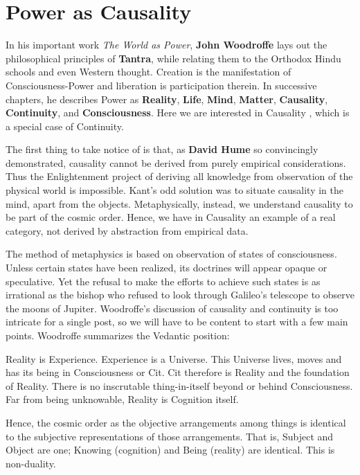 \section{Power as Causality}

In his important work \textit{The World as Power}, \textbf{John Woodroffe} lays out the philosophical principles of \textbf{Tantra}, while relating them to the Orthodox Hindu schools and even Western thought. Creation is the manifestation of Consciousness-Power and liberation is participation therein. In successive chapters, he describes Power as \textbf{Reality}, \textbf{Life}, \textbf{Mind}, \textbf{Matter}, \textbf{Causality}, \textbf{Continuity}, and \textbf{Consciousness}. Here we are interested in Causality , which is a special case of Continuity.

The first thing to take notice of is that, as \textbf{David Hume} so convincingly demonstrated, causality cannot be derived from purely empirical considerations. Thus the Enlightenment project of deriving all knowledge from observation of the physical world is impossible. Kant's odd solution was to situate causality in the mind, apart from the objects. Metaphysically, instead, we understand causality to be part of the cosmic order. Hence, we have in Causality an example of a real category, not derived by abstraction from empirical data.

The method of metaphysics is based on observation of states of consciousness. Unless certain states have been realized, its doctrines will appear opaque or speculative. Yet the refusal to make the efforts to achieve such states is as irrational as the bishop who refused to look through Galileo's telescope to observe the moons of Jupiter. Woodroffe's discussion of causality and continuity is too intricate for a single post, so we will have to be content to start with a few main points. Woodroffe summarizes the Vedantic position:

\begin{quotex}
Reality is Experience. Experience is a Universe. This Universe lives, moves and has its being in Consciousness or Cit. Cit therefore is Reality and the foundation of Reality. There is no inscrutable thing-in-itself beyond or behind Consciousness. Far from being unknowable, Reality is Cognition itself. 

\end{quotex}
Hence, the cosmic order as the objective arrangements among things is identical to the subjective representations of those arrangements. That is, Subject and Object are one; Knowing (cognition) and Being (reality) are identical. This is non-duality.

